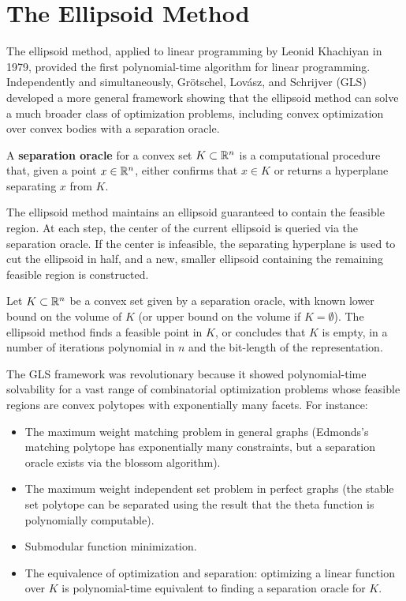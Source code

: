 \section{The Ellipsoid Method}

The ellipsoid method, applied to linear programming by Leonid Khachiyan in 1979, provided the first polynomial-time algorithm for linear programming. Independently and simultaneously, Gr\"{o}tschel, Lov\'{a}sz, and Schrijver (GLS) developed a more general framework showing that the ellipsoid method can solve a much broader class of optimization problems, including convex optimization over convex bodies with a separation oracle.

\begin{definition}
A \textbf{separation oracle} for a convex set \(K \subset \mathbb{R}^n\) is a computational procedure that, given a point \(x \in \mathbb{R}^n\), either confirms that \(x \in K\) or returns a hyperplane separating \(x\) from \(K\).
\end{definition}

The ellipsoid method maintains an ellipsoid guaranteed to contain the feasible region. At each step, the center of the current ellipsoid is queried via the separation oracle. If the center is infeasible, the separating hyperplane is used to cut the ellipsoid in half, and a new, smaller ellipsoid containing the remaining feasible region is constructed.

\begin{theorem}
Let \(K \subset \mathbb{R}^n\) be a convex set given by a separation oracle, with known lower bound on the volume of \(K\) (or upper bound on the volume if \(K = \emptyset\)). The ellipsoid method finds a feasible point in \(K\), or concludes that \(K\) is empty, in a number of iterations polynomial in \(n\) and the bit-length of the representation.
\end{theorem}

The GLS framework was revolutionary because it showed polynomial-time solvability for a vast range of combinatorial optimization problems whose feasible regions are convex polytopes with exponentially many facets. For instance:
\begin{itemize}
  \item The maximum weight matching problem in general graphs (Edmonds's matching polytope has exponentially many constraints, but a separation oracle exists via the blossom algorithm).
  \item The maximum weight independent set problem in perfect graphs (the stable set polytope can be separated using the result that the theta function is polynomially computable).
  \item Submodular function minimization.
  \item The equivalence of optimization and separation: optimizing a linear function over \(K\) is polynomial-time equivalent to finding a separation oracle for \(K\).
\end{itemize}

